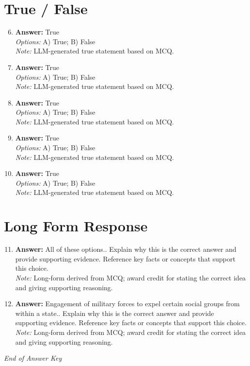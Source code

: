 \documentclass[12pt]{article}
\begin{document}
\section*{True / False}
\begin{enumerate}[label=\arabic*.]
\setcounter{enumi}{5}
\item \textbf{Answer:} True
\\ \textit{Options:} A) True; B) False
\\ \textit{Note:} LLM-generated true statement based on MCQ.
\item \textbf{Answer:} True
\\ \textit{Options:} A) True; B) False
\\ \textit{Note:} LLM-generated true statement based on MCQ.
\item \textbf{Answer:} True
\\ \textit{Options:} A) True; B) False
\\ \textit{Note:} LLM-generated true statement based on MCQ.
\item \textbf{Answer:} True
\\ \textit{Options:} A) True; B) False
\\ \textit{Note:} LLM-generated true statement based on MCQ.
\item \textbf{Answer:} True
\\ \textit{Options:} A) True; B) False
\\ \textit{Note:} LLM-generated true statement based on MCQ.
\end{enumerate}

\section*{Long Form Response}
\begin{enumerate}[label=\arabic*.]
\setcounter{enumi}{10}
\item \textbf{Answer:} All of these options.. Explain why this is the correct answer and provide supporting evidence. Reference key facts or concepts that support this choice.
\\ \textit{Note:} Long-form derived from MCQ; award credit for stating the correct idea and giving supporting reasoning.
\item \textbf{Answer:} Engagement of military forces to expel certain social groups from within a state.. Explain why this is the correct answer and provide supporting evidence. Reference key facts or concepts that support this choice.
\\ \textit{Note:} Long-form derived from MCQ; award credit for stating the correct idea and giving supporting reasoning.
\end{enumerate}

\vfill
\noindent\textit{End of Answer Key}
\end{document}
